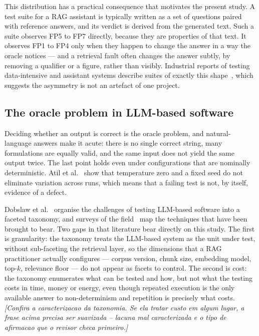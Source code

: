 \documentclass[a4paper,fleqn]{cas-dc}
\newcommand{\nota}[1]{{\color{blue}\itshape [#1]}}
\begin{document}
This distribution has a practical consequence that motivates the present study.
A test suite for a RAG assistant is typically written as a set of questions
paired with reference answers, and its verdict is derived from the generated
text. Such a suite observes FP5 to FP7 directly, because they are properties of
that text. It observes FP1 to FP4 only when they happen to change the answer in
a way the oracle notices --- and a retrieval fault often changes the answer
subtly, by removing a qualifier or a figure, rather than visibly. Industrial
reports of testing data-intensive and assistant systems describe suites of
exactly this shape~\cite{cavalcante2025bigdata,oliveira2026sast}, which suggests
the asymmetry is not an artefact of one project.

\subsection{The oracle problem in LLM-based software}
\label{sec:oracleproblem}

Deciding whether an output is correct is the oracle problem, and
natural-language answers make it acute: there is no single correct string, many
formulations are equally valid, and the same input does not yield the same
output twice. The last point holds even under configurations that are
nominally deterministic. Atil et al.~\cite{atil2025nondeterminism} show that
temperature zero and a fixed seed do not eliminate variation across runs, which
means that a failing test is not, by itself, evidence of a defect.

Dobslaw et al.~\cite{dobslaw2026challenges} organise the challenges of testing
LLM-based software into a faceted taxonomy, and surveys of the
field~\cite{wang2024testing} map the techniques that have been brought to bear.
Two gaps in that literature bear directly on this study. The first is
granularity: the taxonomy treats the LLM-based system as the unit under test,
without sub-faceting the retrieval layer, so the dimensions that a RAG
practitioner actually configures --- corpus version, chunk size, embedding
model, top-$k$, relevance floor --- do not appear as facets to control. The
second is cost: the taxonomy enumerates what can be tested and how, but not
what the testing costs in time, money or energy, even though repeated execution
is the only available answer to non-determinism and repetition is precisely
what costs.
\nota{Confira a caracterizacao da taxonomia. Se ela tratar custo em algum
lugar, a frase acima precisa ser suavizada -- lacuna mal caracterizada e o tipo
de afirmacao que o revisor checa primeiro.}
\end{document}
